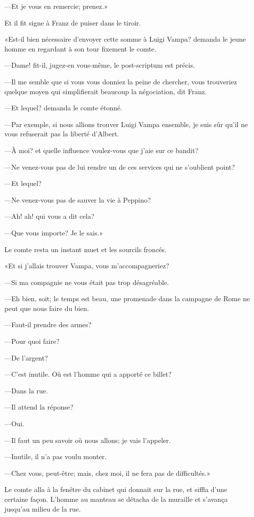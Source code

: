 —Et je vous en remercie; prenez.» 

Et il fit signe à Franz de puiser dans le tiroir.  

«Est-il bien nécessaire d'envoyer cette somme à Luigi Vampa? demanda le jeune homme en regardant à son tour fixement le comte. 

—Dame! fit-il, jugez-en vous-même, le post-scriptum est précis. 

—Il me semble que si vous vous donniez la peine de chercher, vous trouveriez quelque moyen qui simplifierait beaucoup la négociation, dit Franz. 

—Et lequel? demanda le comte étonné. 

—Par exemple, si nous allions trouver Luigi Vampa ensemble, je suis sûr qu'il ne vous refuserait pas la liberté d'Albert. 

—À moi? et quelle influence voulez-vous que j'aie sur ce bandit? 

—Ne venez-vous pas de lui rendre un de ces services qui ne s'oublient point? 

—Et lequel? 

—Ne venez-vous pas de sauver la vie à Peppino? 

—Ah! ah! qui vous a dit cela? 

—Que vous importe? Je le sais.» 

Le comte resta un instant muet et les sourcils froncés.  

«Et si j'allais trouver Vampa, vous m'accompagneriez? 

—Si ma compagnie ne vous était pas trop désagréable. 

—Eh bien, soit; le temps est beau, une promenade dans la campagne de Rome ne peut que nous faire du bien. 

—Faut-il prendre des armes? 

—Pour quoi faire? 

—De l'argent? 

—C'est inutile. Où est l'homme qui a apporté ce billet?  

—Dans la rue. 

—Il attend la réponse? 

—Oui. 

—Il faut un peu savoir où nous allons; je vais l'appeler. 

—Inutile, il n'a pas voulu monter. 

—Chez vous, peut-être; mais, chez moi, il ne fera pas de difficultés.» 

Le comte alla à la fenêtre du cabinet qui donnait sur la rue, et siffla d'une certaine façon. L'homme au manteau se détacha de la muraille et s'avança jusqu'au milieu de la rue. 

